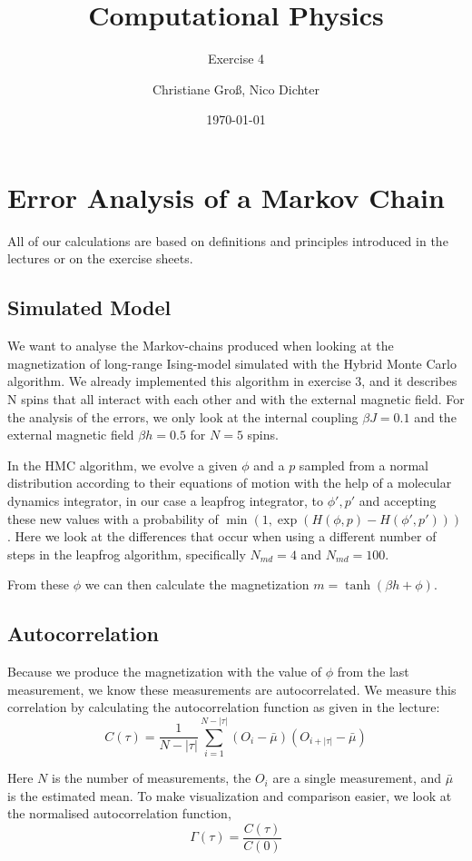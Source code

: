 \documentclass{scrartcl}
\title{Computational Physics}
\subtitle{Exercise 4}
\date{\today}
\author{Christiane Groß, Nico Dichter}
\begin{document}
	\maketitle
\section{Error Analysis of a Markov Chain}
All of our calculations are based on definitions and principles introduced in the lectures or on the exercise sheets.
\subsection{Simulated Model}
We want to analyse the Markov-chains produced when looking at the magnetization of long-range Ising-model simulated with the Hybrid Monte Carlo algorithm. We already implemented this algorithm in exercise 3, and it describes N spins that all interact with each other and with the external magnetic field. For the analysis of the errors, we only look at the internal coupling $\beta J=0.1$ and the external magnetic field $\beta h=0.5$ for $N=5$ spins. 
 
In the HMC algorithm, we evolve a given $\phi$ and a $p$ sampled from a normal distribution according to their equations of motion with the help of a molecular dynamics integrator, in our case a leapfrog integrator, to $\phi', p'$ and accepting these new values with a probability of $\min(1, \exp(H(\phi, p)-H(\phi', p')))$. Here we look at the differences that occur when using a different number of steps in the leapfrog algorithm, specifically $N_{md}=4$ and $N_{md}=100$.

From these $\phi$ we can then calculate the magnetization $m=\tanh(\beta h+\phi)$.

\subsection{Autocorrelation}

Because we produce the magnetization with the value of $\phi$ from the last measurement, we know these measurements are autocorrelated. We measure this correlation by calculating the autocorrelation function as given in the lecture:
\[
C(\tau)=\frac{1}{N-|\tau|}\sum_{i=1}^{N-|\tau|}(O_i-\bar{\mu})(O_{i+|\tau|}-\bar{\mu})\]

Here $N$ is the number of measurements, the $O_i$ are a single measurement, and $\bar{\mu}$ is the estimated mean. To make visualization and comparison easier, we look at the normalised autocorrelation function, \[
\Gamma(\tau)=\frac{C(\tau)}{C(0)}
\]
\end{document}
